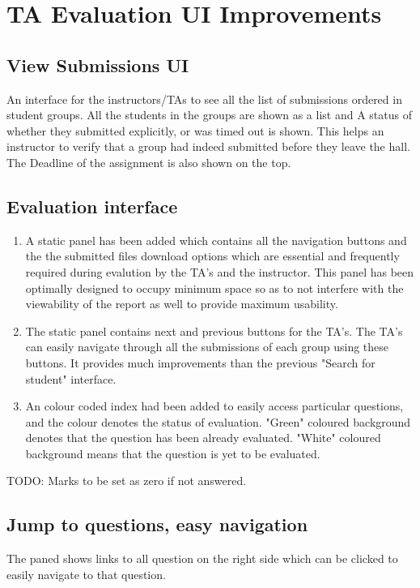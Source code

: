 \section{TA Evaluation UI Improvements}

\subsection{View Submissions UI}
An interface for the instructors/TAs to see all the list of submissions ordered in student groups. All the students in the groups are shown as a list and A status of whether they submitted explicitly, or was timed out is shown. This helps an instructor to verify that a group had indeed submitted before they leave the hall. The Deadline of the assignment is also shown on the top.

\subsection{Evaluation interface}

\begin{enumerate}
\item A static panel has been added which contains all the navigation buttons and the the submitted files download options which are essential and frequently required during evalution by the TA's and the instructor. This panel has been optimally designed to occupy minimum space so as to not interfere with the viewability of the report as well to provide maximum usability.
\item The static panel contains next and previous buttons for the TA's. The TA's can easily navigate through all the submissions of each group using these buttons. It provides much improvements than the previous "Search for student" interface.
\item An colour coded index had been added to easily access particular questions, and the colour denotes the status of evaluation. "Green" coloured background denotes that the question has been already evaluated. "White" coloured background means that the question is yet to be evaluated.
\end{enumerate}

TODO: Marks to be set as zero if not answered.

\subsection{Jump to questions, easy navigation}
The paned shows links to all question on the right side which can be clicked to easily navigate to that question.